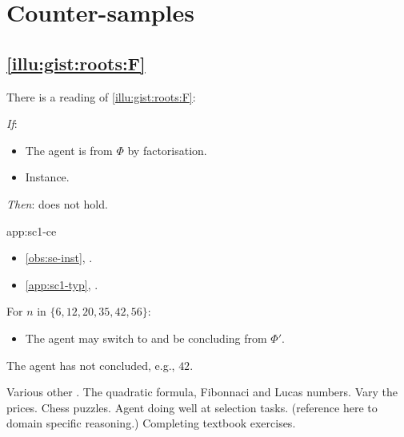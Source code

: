 \section{Counter-samples}
\label{sec:counter-samples}



\subsection{\autoref{illu:gist:roots:F}}


\begin{note}
  \begin{application}%
    \label{app:sc1-ce}%
    There is a reading of \autoref{illu:gist:roots:F}:
    \begin{itenum}
    \item[\emph{If}:]
      \begin{itemize}
      \item
        The agent is \tCV{}  from \(\Phi\) by factorisation.
      \item
        {
          \color{blue}
          Instance.
        }
      \end{itemize}
    \item[\emph{Then}:]
      \issueInclusion{} does not hold.
    \end{itenum}
  \end{application}

  \begin{dets}{app:sc1-ce}
    \begin{itemize}
    \item
      \autoref{obs:se-inst}, \se{}.
    \item
      \autoref{app:sc1-typ}, .
    \end{itemize}

    For \(n\) in  \(\{6, 12, 20, 35, 42, 56\}\):
    \begin{itemize}
    \item
      The agent may switch to \rootsConEqGen{} and be concluding  from \(\Phi'\).
    \end{itemize}

    The agent has not concluded, e.g., \(42\).
  \end{dets}
\end{note}



\begin{note}
  Various other .
  The quadratic formula, Fibonnaci and Lucas numbers.
  Vary the prices.
  Chess puzzles.
  Agent doing well at selection tasks. (reference here to domain specific reasoning.)
  Completing textbook exercises.
\end{note}


